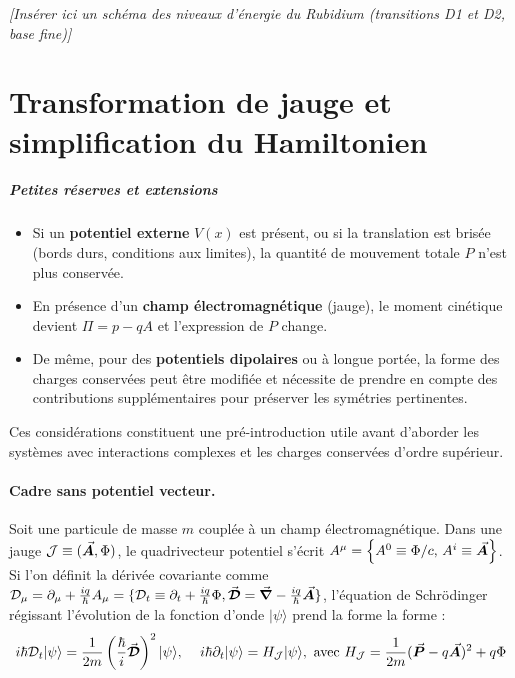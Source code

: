 \vspace{1em}
\begin{center}
\textit{[Insérer ici un schéma des niveaux d’énergie du Rubidium (transitions D1 et D2, base fine)]}
\end{center}

\section{Transformation de jauge et simplification du Hamiltonien}


\subparagraph{Petites réserves et extensions}

\begin{itemize}
    \item Si un \textbf{potentiel externe} $V(x)$ est présent, ou si la translation est brisée (bords durs, conditions aux limites), la quantité de mouvement totale $P$ n’est plus conservée.
    \item En présence d’un \textbf{champ électromagnétique} (jauge), le moment cinétique devient $\Pi = p - q A$ et l’expression de $P$ change.
    \item De même, pour des \textbf{potentiels dipolaires} ou à longue portée, la forme des charges conservées peut être modifiée et nécessite de prendre en compte des contributions supplémentaires pour préserver les symétries pertinentes.
\end{itemize}

Ces considérations constituent une pré-introduction utile avant d’aborder les systèmes avec interactions complexes et les charges conservées d’ordre supérieur.

\paragraph{Cadre sans potentiel vecteur.}

Soit une particule de masse $m$ couplée à un champ électromagnétique. Dans une jauge $\mathcal{J} \equiv (\vec{{\bm{A}}}, \Phi)$, le quadrivecteur potentiel s’écrit $A^\mu = \left\{ A^0 \equiv \Phi/c,\, A^i \equiv \vec{{\bm{A}}} \right\}$. Si l’on définit la dérivée covariante comme $\mathcal{D}_\mu = \partial_\mu + \frac{iq}{\hbar} A_\mu = \{ \mathcal{D}_t \equiv \partial_t + \frac{iq}{\hbar} \Phi , \vec{{\bm{\mathcal{D}}}} = \vec{{\bm{\nabla}}} - \frac{iq}{\hbar} \vec{{\bm{A}}}  \} $, l’équation de Schrödinger régissant l’évolution de la fonction d’onde $\vert \psi \rangle$  prend la forme la forme :
\begin{eqnarray}
	i\hbar \mathcal{D}_t \vert \psi \rangle = \frac{1}{2m} \left( \frac{\hbar}{i} \vec{{\bm{\mathcal{D}}}} \right)^2 \vert \psi \rangle, \, \quad   i\hbar \partial_t \vert \psi \rangle = H_{\mathcal{J}} \vert \psi \rangle , ~\mbox{avec}~	H_{\mathcal{J}} = \frac{1}{2m} (\vec{{\bm{P}}} - q \vec{{\bm{A}}})^2 + q\Phi
\end{eqnarray}


